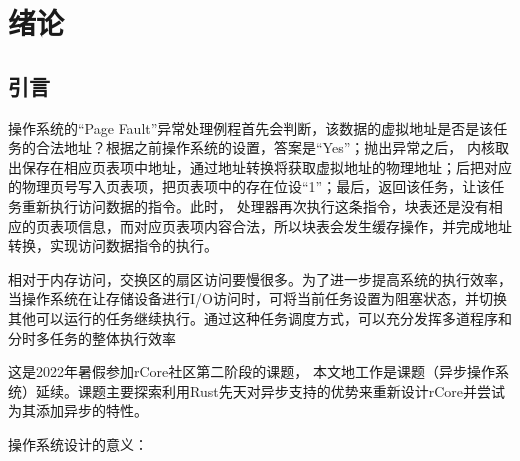 \chapter{绪论}
\label{chap:references}

\section{引言}

操作系统的“Page Fault”异常处理例程首先会判断，该数据的虚拟地址是否是该任务的合法地址？根据之前操作系统的设置，答案是“Yes”；抛出异常之后， 内核取出保存在相应页表项中地址，通过地址转换将获取虚拟地址的物理地址；后把对应的物理页号写入页表项，把页表项中的存在位设“1”；最后，返回该任务，让该任务重新执行访问数据的指令。此时， 处理器再次执行这条指令，块表还是没有相应的页表项信息，而对应页表项内容合法，所以块表会发生缓存操作，并完成地址转换，实现访问数据指令的执行。

相对于内存访问，交换区的扇区访问要慢很多。为了进一步提高系统的执行效率，当操作系统在让存储设备进行I/O访问时，可将当前任务设置为阻塞状态，并切换其他可以运行的任务继续执行。通过这种任务调度方式，可以充分发挥多道程序和分时多任务的整体执行效率

这是2022年暑假参加rCore社区第二阶段的课题， 本文地工作是课题（异步操作系统）延续。课题主要探索利用Rust先天对异步支持的优势来重新设计rCore并尝试为其添加异步的特性。

操作系统设计的意义：

